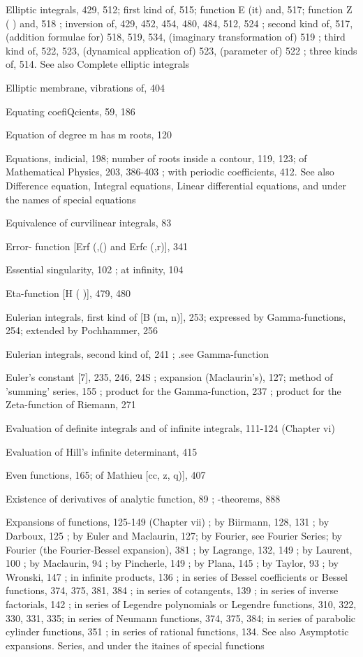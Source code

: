 %
%

Elliptic integrals, 429, 512; first kind of, 515; function E (it) and, 517; function Z ( ) and,
518 ; inversion of, 429, 452, 454, 480, 484, 512, 524 ; second kind of, 517, (addition formulae
for) 518, 519, 534, (imaginary transformation of) 519 ; third kind of, 522, 523, (dynamical
application of) 523, (parameter of) 522 ; three kinds of, 514. See also Complete elliptic
integrals

Elliptic membrane, vibrations of, 404

Equating coefiQcients, 59, 186

Equation of degree m has m roots, 120

Equations, indicial, 198; number of roots inside a contour, 119, 123; of Mathematical Physics,
203, 386-403 ; with periodic coefficients, 412. See also Difference equation, Integral
equations, Linear differential equations, and under the names of special equations

Equivalence of curvilinear integrals, 83

Error- function [Erf (,() and Erfc (,r)], 341

Essential singularity, 102 ; at infinity, 104

Eta-function [H ( )], 479, 480

Eulerian integrals, first kind of [B (m, n)], 253; expressed by Gamma-functions, 254; extended
by Pochhammer, 256

Eulerian integrals, second kind of, 241 ; .see Gamma-function

Euler's constant [7], 235, 246, 24S ; expansion (Maclaurin's), 127; method of 'summing' series,
155 ; product for the Gamma-function, 237 ; product for the Zeta-function of Riemann, 271

Evaluation of definite integrals and of infinite integrals, 111-124 (Chapter vi)

Evaluation of Hill's infinite determinant, 415

Even functions, 165; of Mathieu [cc,  z, q)], 407

Existence of derivatives of analytic function, 89 ; -theorems, 888

Expansions of functions, 125-149 (Chapter vii) ; by Biirmann, 128, 131 ; by Darboux, 125 ; by
Euler and Maclaurin, 127; by Fourier, see Fourier Series; by Fourier (the Fourier-Bessel
expansion), 381 ; by Lagrange, 132, 149 ; by Laurent, 100 ; by Maclaurin, 94 ; by Pincherle,
149 ; by Plana, 145 ; by Taylor, 93 ; by Wronski, 147 ; in infinite products, 136 ; in series of
Bessel coefficients or Bessel functions, 374, 375, 381, 384 ; in series of cotangents, 139 ; in
series of inverse factorials, 142 ; in series of Legendre polynomials or Legendre functions,
310, 322, 330, 331, 335; in series of Neumann functions, 374, 375, 384; in series of parabolic
cylinder functions, 351 ; in series of rational functions, 134. See also Asymptotic expansions.
Series, and under the itaines of special functions

